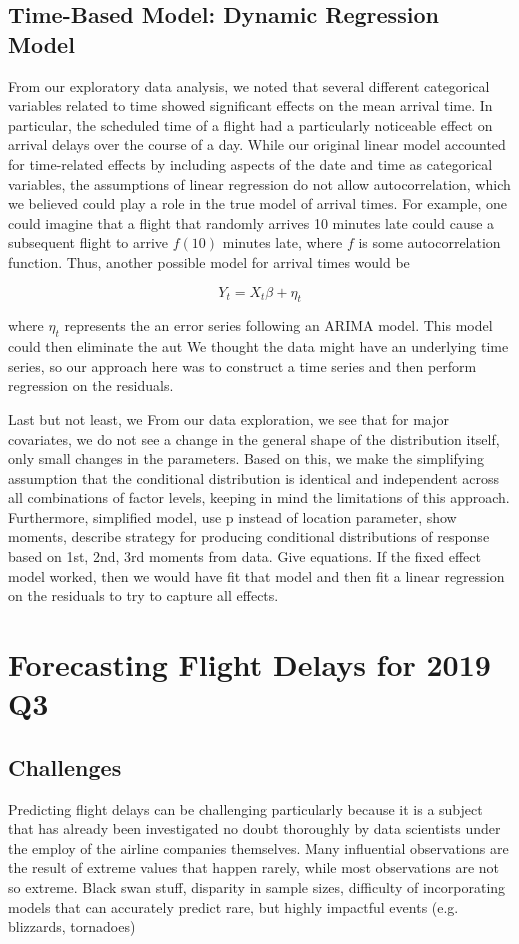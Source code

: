 \documentclass[12pt, a4paper, openany]{book}
\newcommand\tab[1][1cm]{\hspace*{#1}}
\begin{document}
		
	\section{Time-Based Model: Dynamic Regression Model}
	\tab From our exploratory data analysis, we noted that several different categorical variables related to time showed significant effects on the mean arrival time. In particular, the scheduled time of a flight had a particularly noticeable effect on arrival delays over the course of a day. While our original linear model accounted for time-related effects by including aspects of the date and time as categorical variables, the assumptions of linear regression do not allow autocorrelation, which we believed could play a role in the true model of arrival times. For example, one could imagine that a flight that randomly arrives 10 minutes late could cause a subsequent flight to arrive $f(10)$ minutes late, where $f$ is some autocorrelation function. Thus, another possible model for arrival times would be 
	\begin{center}
	$$Y_t = X_t\beta + \eta_t$$
	\end{center}
	where $\eta_t$ represents the an error series following an ARIMA model. This model could then eliminate the aut We thought the data might have an underlying time series, so our approach here was to construct a time series and then perform regression on the residuals. 

	\tab Last but not least, we   From our data exploration, we see that for major covariates, we do not see a change in the general shape of the distribution itself, only small changes in the parameters. Based on this, we make the simplifying assumption that the conditional distribution is identical and independent across all combinations of factor levels, keeping in mind the limitations of this approach.  Furthermore, simplified model, use p instead of location parameter, show moments, describe strategy for producing conditional distributions of response based on 1st, 2nd, 3rd moments from data. Give equations. If the fixed effect model worked, then we would have fit that model and then fit a linear regression on the residuals to try to capture all effects. \\
	

\chapter{Forecasting Flight Delays for 2019 Q3}
	\section{Challenges}
	\tab Predicting flight delays can be challenging particularly because it is a subject that has already been investigated no doubt thoroughly by data scientists under the employ of the airline companies themselves. Many influential observations are the result of extreme values that happen rarely, while most observations are not so extreme. Black swan stuff, disparity in sample sizes, difficulty of incorporating models that can accurately predict rare, but highly impactful events (e.g. blizzards, tornadoes)
\end{document}
